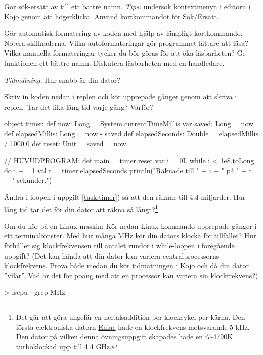 \Subtask Gör sök-ersätt av  till ett bättre namn. \emph{Tips:} undersök kontextmenyn i editorn i Kojo genom att högerklicka. Använd kortkommandot för Sök/Ersätt.

\Subtask Gör automatisk formatering av koden med hjälp av lämpligt kortkommando. Notera skillnaderna. Vilka autoformateringar gör programmet lättare att läsa? Vilka manuella formateringar tycker du bör göras för att öka läsbarheten? Ge funktionen  ett bättre namn.  Diskutera läsbarheten med en handledare.



\Task \label{task:measuretime} \emph{Tidmätning.} Hur snabb är din dator?

\Subtask \label{task:timer} Skriv in koden nedan i replen och kör upprepade gånger genom att skriva  i replen. Tar det lika lång tid varje gång? Varför?

\begin{Code}
object timer:
  def now: Long = System.currentTimeMillis
  var saved: Long = now
  def elapsedMillis: Long = now - saved
  def elapsedSeconds: Double = elapsedMillis / 1000.0
  def reset: Unit =
    saved = now

// HUVUDPROGRAM:
def main =
  timer.reset
  var i = 0L
  while i < 1e8.toLong do
    i += 1
  val t = timer.elapsedSeconds
  println("Räknade till " + i + " på " + t + " sekunder.")
\end{Code}


\Subtask Ändra i loopen i uppgift \ref{task:timer}) så att den räknar till 4.4 miljarder. Hur lång tid tar det för din dator att räkna så långt?\footnote{Det går att göra ungefär en heltalsaddition per klockcykel per kärna. Den första elektroniska datorn \href{https://sv.wikipedia.org/wiki/ENIAC}{Eniac} hade en klockfrekvens motsvarande 5 kHz. Den dator på vilken denna övningsuppgift skapades hade en i7-4790K turboklockad upp till 4.4 GHz.
}

\Subtask  Om du kör på en Linux-maskin: Kör nedan Linux-kommando upprepade gånger i ett terminalfönster. Med hur många MHz kör din dators klocka för tillfället? Hur förhåller sig klockfrekvensen till antalet rundor i while-loopen i föregående uppgift? (Det kan hända att din dator kan variera centralprocessorns klockfrekvens. Prova både medan du kör tidmätningen i Kojo och då din dator ''vilar''. Vad är det för poäng med att en processor kan variera sin klockfrekvens?)
\begin{REPLnonum}
> lscpu | grep MHz
\end{REPLnonum}


